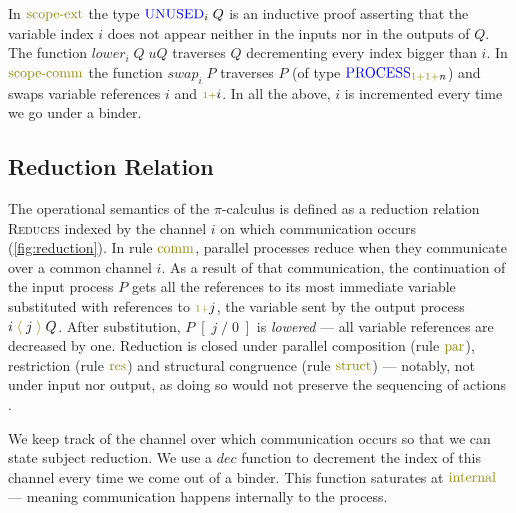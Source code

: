 \documentclass[a4paper,UKenglish,cleveref, autoref, thm-restate,authorcolumns]{lipics-v2019}
\theoremstyle{definition}
\newcommand{\picalc}{$\pi$-calculus}
\newcommand{\type}[1]{\textcolor{blue}{\operatorname{#1}}}
\newcommand{\constr}[1]{\textcolor{olive}{\operatorname{#1}}}
\newcommand{\send}[2]{#1 \; \constr{\langle} \; #2 \;\constr{\rangle} \;}
\newcommand{\suc}{\constr{\scriptstyle 1+}}
\newcommand{\subst}[3]{#1 \; [ \; #2 \; / \;#3 \;]}
\newcommand{\Process}{\type{PROCESS}}
\newcommand{\Unused}{\type{UNUSED}}
\begin{document}
In $\constr{scope-ext}$ the type $\Unused_i \; Q$ is an inductive proof asserting that the variable index $i$ does not appear neither in the inputs nor in the outputs of $Q$.
The function $lower_i \; Q \; uQ$ traverses $Q$ decrementing every index bigger than $i$.
In $\constr{scope-comm}$ the function $swap_i \; P$ traverses $P$ (of type $\Process_{\suc \suc n}$) and swaps variable references $i$ and $\suc i$.
In all the above, $i$ is incremented every time we go under a binder.
  
\subsection{Reduction Relation}
\label{operational-semantics}

The operational semantics of the \picalc{} is defined as a reduction relation \textsc{Reduces} indexed by the channel $i$ on which communication occurs (\autoref{fig:reduction}).
In rule $\constr{comm}$, parallel processes reduce when they communicate over a common channel ${i}$.
As a result of that communication, the continuation of the input process $P$ gets all the references to its most immediate variable substituted with references to $\suc j$, the variable sent by the output process $\send{i}{j}{Q}$.
After substitution, $\subst{P}{j}{0}$ is \emph{lowered} --- all variable references are decreased by one.
Reduction is closed under parallel composition (rule $\constr{par}$), restriction (rule $\constr{res}$) and structural congruence (rule $\constr{struct}$) 
--- notably, not under input nor output, as doing so would not preserve the sequencing of actions \cite{Sangio01}.

We keep track of the channel over which communication occurs so that we can state subject reduction.
We use a $dec$ function to decrement the index of this channel every time we come out of a binder.
This function saturates at $\constr{internal}$ --- meaning communication happens internally to the process.
\end{document}
